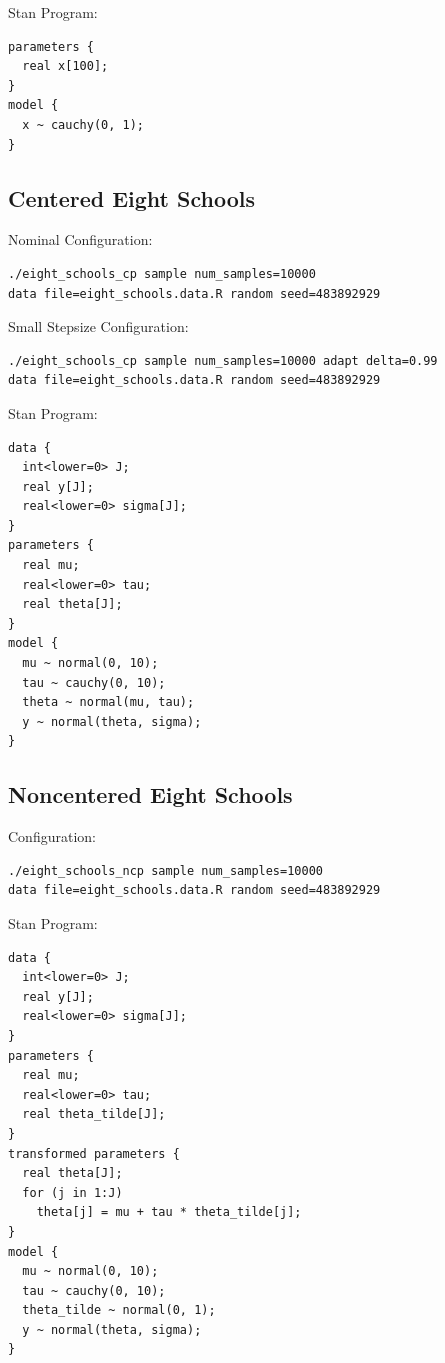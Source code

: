\documentclass[stslayout]{imsart}
\begin{document}
\noindent Stan Program:

{\small
\begin{verbatim}
parameters {
  real x[100];
}
model {
  x ~ cauchy(0, 1);
}

\end{verbatim}
}

\subsection{Centered Eight Schools}

\noindent Nominal Configuration:

{\small
\begin{verbatim}
./eight_schools_cp sample num_samples=10000
data file=eight_schools.data.R random seed=483892929
\end{verbatim}
}

\noindent Small Stepsize Configuration:

{\small
\begin{verbatim}
./eight_schools_cp sample num_samples=10000 adapt delta=0.99
data file=eight_schools.data.R random seed=483892929
\end{verbatim}
}

\noindent Stan Program:

{\small
\begin{verbatim}
data {
  int<lower=0> J;
  real y[J];
  real<lower=0> sigma[J];
}
parameters {
  real mu;
  real<lower=0> tau;
  real theta[J];
}
model {
  mu ~ normal(0, 10);
  tau ~ cauchy(0, 10);
  theta ~ normal(mu, tau);
  y ~ normal(theta, sigma);
}
\end{verbatim}
}

\subsection{Noncentered Eight Schools}

\noindent Configuration:

{\small
\begin{verbatim}
./eight_schools_ncp sample num_samples=10000
data file=eight_schools.data.R random seed=483892929
\end{verbatim}
}

\noindent Stan Program:

{\small
\begin{verbatim}
data {
  int<lower=0> J;
  real y[J];
  real<lower=0> sigma[J];
}
parameters {
  real mu;
  real<lower=0> tau;
  real theta_tilde[J];
}
transformed parameters {
  real theta[J];
  for (j in 1:J)
    theta[j] = mu + tau * theta_tilde[j];
}
model {
  mu ~ normal(0, 10);
  tau ~ cauchy(0, 10);
  theta_tilde ~ normal(0, 1);
  y ~ normal(theta, sigma);
}
\end{verbatim}
}



\end{document}
